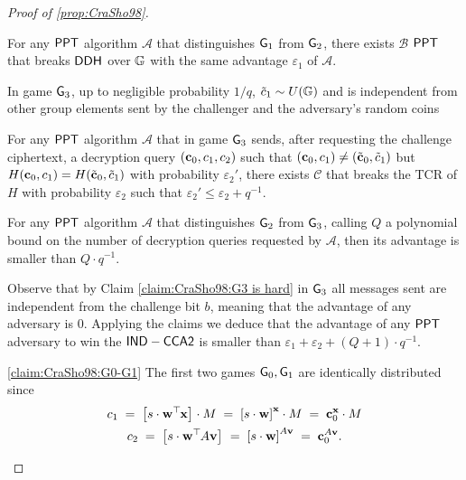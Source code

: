 \begin{proof}[Proof of \ref{prop:CraSho98}]
\begin{claim}
	\label{claim:CraSho98:G1-G2}
	For any $\mathsf{PPT}$ algorithm $\mathcal{A}$ that distinguishes $\mathsf{G}_1$ from $\mathsf{G}_2$, there exists $\mathcal{B}$ $\mathsf{PPT}$ that breaks $\mathsf{DDH}^{}$ over $\mathbb{G}$ with the same advantage $\varepsilon_1$ of $\mathcal{A}$.
\end{claim}

\begin{claim}
	\label{claim:CraSho98:G3 is hard}
	In game $\mathsf{G}_3$, up to negligible probability $1/q$, $\tilde{c}_1 \sim U(\mathbb{G})$ and is independent from other group elements sent by the challenger and the adversary's random coins
\end{claim}	
	
\begin{claim}
	\label{claim:CraSho98:TCR}
	For any $\mathsf{PPT}$ algorithm $\mathcal{A}$ that in game $\mathsf{G}_3$ sends, after requesting the challenge ciphertext, a decryption query $(\mathbf{c}_0, c_1, c_2)$ such that $(\mathbf{c}_0, c_1) \neq (\tilde{\mathbf{c}}_0, \tilde{c}_1)$ but $H(\mathbf{c}_0, c_1) = H(\tilde{\mathbf{c}}_0, \tilde{c}_1)$ with probability $\varepsilon_2'$, there exists $\mathcal{C}$ that breaks the TCR of $H$ with probability $\varepsilon_2$ such that $\varepsilon_2' \leq \varepsilon_2 + q^{-1}$.
\end{claim}
	
\begin{claim}
	\label{claim:CraSho98:G2-G3}
	For any $\mathsf{PPT}$ algorithm $\mathcal{A}$ that distinguishes $\mathsf{G}_2$ from $\mathsf{G}_3$, calling $Q$ a polynomial bound on the number of decryption queries requested by $\mathcal{A}$, then its advantage is smaller than $Q \cdot q^{-1}$.
\end{claim}

Observe that by Claim \ref{claim:CraSho98:G3 is hard} in $\mathsf{G}_3$ all messages sent are independent from the challenge bit $b$, meaning that the advantage of any adversary is $0$. Applying the claims we deduce that the advantage of any $\mathsf{PPT}$ adversary to win the $\mathsf{IND-CCA2}$ is smaller than $\varepsilon_1 + \varepsilon_2 + (Q + 1) \cdot q^{-1}$.

\begin{claimproof}{\ref{claim:CraSho98:G0-G1}}
	The first two games $\mathsf{G}_0, \mathsf{G}_1$ are identically distributed since
	\begin{gather*}
	c_1	
		\; = \;
	\left[{s \cdot \mathbf{w}^\top\hspace{-.1em} \mathbf{x}}\right]_{} \cdot M
		\; = \;
	\left[{s \cdot \mathbf{w}}\right]_{}^{\mathbf{x}} \cdot M
		\; = \;
	\mathbf{c}_0^{\mathbf{x}} \cdot M
		\\
	c_2
		\; = \;
	\left[{s \cdot \mathbf{w}^\top\hspace{-.1em} A \mathbf{v}}\right]_{}
		\; = \;
	\left[{s \cdot \mathbf{w}}\right]_{}^{A \mathbf{v}}
		\; = \;
	\mathbf{c}_0^{A \mathbf{v}}.
	\end{gather*}
\end{claimproof}


\end{proof}
